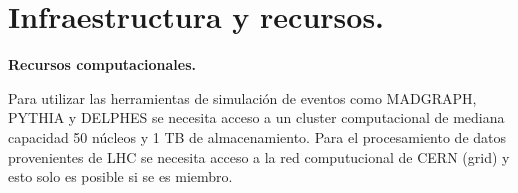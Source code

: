 \section{Infraestructura y recursos.}

\textbf{Recursos computacionales.}

Para utilizar las herramientas de simulación de eventos como MADGRAPH, PYTHIA y DELPHES se necesita acceso a un cluster computacional de mediana capacidad	 50 núcleos y 1 TB de almacenamiento. Para el procesamiento de datos provenientes de LHC se necesita acceso a la red computucional de CERN (grid) y esto solo es posible si se es miembro.

\newpage





